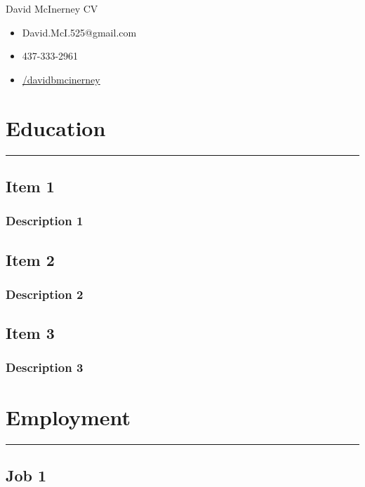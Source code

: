 \documentclass[11pt]{article}
\begin{document}
		\def\arraystretch{1.3}	 %
			\begin{minipage}[b]{0.6\textwidth}
				\begin{flushleft}
					{\noindent \Huge David McInerney CV}
				\end{flushleft}	 
			\end{minipage}
			\begin{minipage}[b]{0.32\textwidth}
			\begin{itemize}
				\item David.McI.525@gmail.com
				\item 437-333-2961
				\item \href{http://www.linkedin.com/in/davidbmcinerney}{/davidbmcinerney}
			\end{itemize}
		\end{minipage}

        \section{Education}
		\hrule \hfill
			\subsection{Item 1}
				\subsubsection{Description 1}
			\subsection{Item 2}
				\subsubsection{Description 2}
			\subsection{Item 3}
				\subsubsection{Description 3}
        \section{Employment}
		\hrule \hfill
			\subsection{Job 1}
\end{document}
